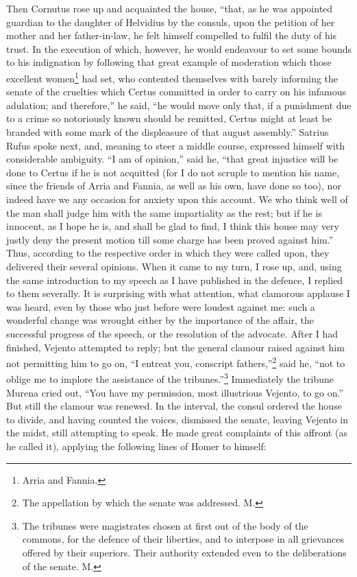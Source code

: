 Then Cornutus rose up and acquainted the house, ``that, as he was appointed
guardian to the daughter of Helvidius by the consuls, upon the petition of
her mother and her father-in-law, he felt himself compelled to fulfil the
duty of his trust. In the execution of which, however, he would endeavour
to set some bounds to his indignation by following that great example of
moderation which those excellent women\footnote{Arria and Fannia.} had set, who
contented themselves with barely informing the senate of the cruelties
which Certus committed in order to carry on his infamous adulation; and
therefore,'' he said, ``he would move only that, if a punishment due to a
crime so notoriously known should be remitted, Certus might at least be
branded with some mark of the displeasure of that august assembly.''
Satrius Rufus spoke next, and, meaning to steer a middle course, expressed
himself with considerable ambiguity. ``I am of opinion,'' said he, ``that
great injustice will be done to Certus if he is not acquitted (for I do
not scruple to mention his name, since the friends of Arria and Fannia, as
well as his own, have done so too), nor indeed have we any occasion for
anxiety upon this account. We who think well of the man shall judge him
with the same impartiality as the rest; but if he is innocent, as I hope
he is, and shall be glad to find, I think this house may very justly deny
the present motion till some charge has been proved against him.'' Thus,
according to the respective order in which they were called upon, they
delivered their several opinions. When it came to my turn, I rose up, and,
using the same introduction to my speech as I have published in the
defence, I replied to them severally. It is surprising with what
attention, what clamorous applause I was heard, even by those who just
before were loudest against me: such a wonderful change was wrought either
by the importance of the affair, the successful progress of the speech, or
the resolution of the advocate. After I had finished, Vejento attempted to
reply; but the general clamour raised against him not permitting him to go
on, ``I entreat you, conscript fathers,''\footnote{The appellation by
which the senate was addressed. M.} said he, ``not to
oblige me to implore the assistance of the tribunes.''\footnote{The tribunes were
magistrates chosen at first out of the body of the commons, for the
defence of their liberties, and to interpose in all grievances offered by
their superiors. Their authority extended even to the deliberations of the
senate. M.}
Immediately the tribune Murena cried out, ``You have my permission, most
illustrious Vejento, to go on.'' But still the clamour was renewed. In the
interval, the consul ordered the house to divide, and having counted the
voices, dismissed the senate, leaving Vejento in the midst, still
attempting to speak. He made great complaints of this affront (as he
called it), applying the following lines of Homer to himself:

